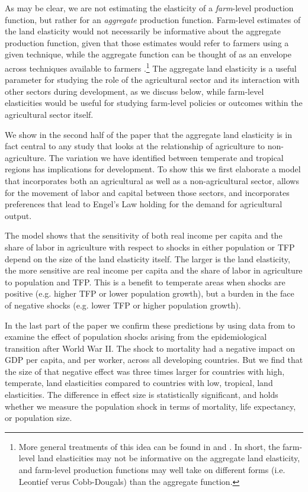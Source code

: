 \documentclass[11pt]{article}
\begin{document}
As may be clear, we are not estimating the elasticity of a \textit{farm}-level production function, but rather for an \textit{aggregate} production function. Farm-level estimates of the land elasticity would not necessarily be informative about the aggregate production function, given that those estimates would refer to farmers using a given technique, while the aggregate function can be thought of as an envelope across techniques available to farmers \citep{Hayami:1970ly}.\footnote{More general treatments of this idea can be found in \citet{houthakker1955} and \citet{jones2005}. In short, the farm-level land elasticities may not be informative on the aggregate land elasticity, and farm-level production functions may well take on different forms (i.e. Leontief verus Cobb-Dougals) than the aggregate function.} The aggregate land elasticity is a useful parameter for studying the role of the agricultural sector and its interaction with other sectors during development, as we discuss below, while farm-level elasticities would be useful for studying farm-level policies or outcomes within the agricultural sector itself.

We show in the second half of the paper that the aggregate land elasticity is in fact central to any study that looks at the relationship of agriculture to non-agriculture. The variation we have identified between temperate and tropical regions has implications for development. To show this we first elaborate a model that incorporates both an agricultural as well as a non-agricultural sector, allows for the movement of labor and capital between those sectors, and incorporates preferences that lead to Engel's Law holding for the demand for agricultural output. 

The model shows that the sensitivity of both real income per capita and the share of labor in agriculture with respect to shocks in either population or TFP depend on the size of the land elasticity itself. The larger is the land elasticity, the more sensitive are real income per capita and the share of labor in agriculture to population and TFP. This is a benefit to temperate areas when shocks are positive (e.g. higher TFP or lower population growth), but a burden in the face of negative shocks (e.g. lower TFP or higher population growth).

In the last part of the paper we confirm these predictions by using data from \cite{aj07} to examine the effect of population shocks arising from the epidemiological transition after World War II. The shock to mortality had a negative impact on GDP per capita, and per worker, across all developing countries. But we find that the size of that negative effect was three times larger for countries with high, temperate, land elasticities compared to countries with low, tropical, land elasticities. The difference in effect size is statistically significant, and holds whether we measure the population shock in terms of mortality, life expectancy, or population size.
\end{document}
